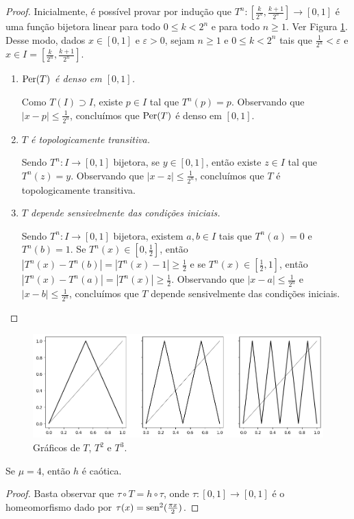 \begin{proof}
Inicialmente, é possível provar por indução que $T^n: [\frac{k}{2^n}, \frac{k+1}{2^n}] \to [0,1]$ é uma função bijetora linear para todo $0 \leq k  < 2^n$ e para todo $n \geq 1$.
Ver Figura \ref{tentmap}.
Desse modo, dados $x \in [0, 1]$ e $\varepsilon > 0$, sejam $n \geq 1$ e $0 \leq k < 2^n$ tais que $\frac{1}{2^n} < \varepsilon$ e $x \in I = \left[\frac{k}{2^n}, \frac{k+1}{2^n}\right]$.

\begin{enumerate}[label=\alph*)]
\item \textit{$\operatorname{Per}(T)$ é denso em $[0, 1]$.}

Como $T(I) \supset I$, existe $p \in I$ tal que $T^n(p) = p$. Observando que $|x-p| \leq \frac{1}{2^n}$, concluímos que $\operatorname{Per}(T)$ é denso em $[0, 1]$.

\item \textit{$T$ é topologicamente transitiva.}

Sendo $T^n: I \to [0,1]$ bijetora, se $y \in [0, 1]$, então existe $z \in I$ tal que $T^n(z) = y$.
Observando que $|x - z| \leq \frac{1}{2^n}$, concluímos que $T$ é topologicamente transitiva.

\item \textit{$T$ depende sensivelmente das condições iniciais.}

Sendo $T^n: I \to [0,1]$ bijetora, existem $a, b \in I$ tais que $T^n(a) = 0$ e $T^n(b) = 1$. Se $T^n(x) \in [0, \frac{1}{2}]$, então $|T^n(x) - T^n(b)| = |T^n(x) - 1| \geq \frac{1}{2}$ e se $T^n(x) \in [\frac{1}{2}, 1]$, então $|T^n(x) - T^n(a)| = |T^n(x)| \geq \frac{1}{2}$. Observando que $|x - a| \leq \frac{1}{2^n}$ e $|x - b| \leq \frac{1}{2^n}$, concluímos que $T$ depende sensivelmente das condições iniciais.
\end{enumerate}
\end{proof}

\begin{figure}[!htb]
\centering
\includegraphics[scale=0.6]{images/tentmap.png}
\caption{Gráficos de $T$, $T^2$ e $T^3$.}
\label{tentmap}
\end{figure}

\begin{theorem}
Se $\mu = 4$, então $h$ é caótica.
\end{theorem}

\begin{proof}
Basta observar que $\tau \circ T = h \circ \tau$, onde $\tau: [0, 1] \to [0, 1]$ é o homeomorfismo dado por $\tau(x) = \operatorname{sen}^2(\frac{\pi x}{2})$.
\end{proof}

